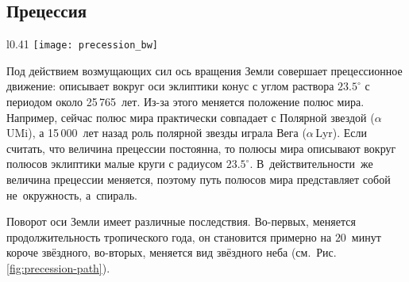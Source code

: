 \subsection{Прецессия}
\begin{wrapfigure}[15]{l}{0.41\tw}
	\vspace{-1pc}
	\centering
	\texttt{[image: precession\_bw]}
	\caption{Прецессионное движение северного полюса мира}
	\label{fig:precession-path}
\end{wrapfigure}
Под действием возмущающих сил ось вращения Земли совершает прецессионное движение: описывает вокруг оси эклиптики конус с углом раствора $23.5^\circ$ с периодом около  25\,765~лет. Из-за этого меняется положение полюс мира. Например, сейчас полюс мира практически совпадает с Полярной звездой ($\alpha$\,UMi), а 15\,000~лет назад роль полярной звезды играла Вега ($\alpha$\,Lyr). Если считать, что величина прецессии постоянна, то полюсы мира описывают вокруг полюсов эклиптики малые круги с радиусом $23.5^\circ$. В~действительности~же величина прецессии меняется, поэтому путь полюсов мира представляет собой не~окружность, а~спираль.

Поворот оси Земли имеет различные последствия. Во-первых, меняется продолжительность тропического года, он становится примерно на $20$~минут короче звёздного, во-вторых, меняется вид звёздного неба  (см.~Рис.\,\ref{fig:precession-path}).